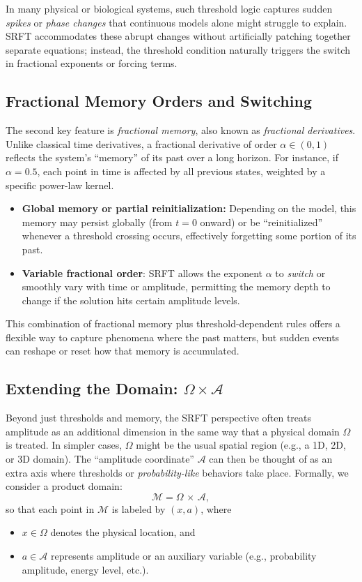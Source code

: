 \documentclass[12pt]{article}
\begin{document}
In many physical or biological systems, such threshold logic captures sudden
\emph{spikes} or \emph{phase changes} that continuous models alone might struggle to
explain. SRFT accommodates these abrupt changes without artificially patching
together separate equations; instead, the threshold condition naturally triggers
the switch in fractional exponents or forcing terms.

\subsection{Fractional Memory Orders and Switching}
The second key feature is \emph{fractional memory}, also known as
\emph{fractional derivatives}. Unlike classical time derivatives, a fractional
derivative of order $\alpha \in (0,1)$ reflects the system’s ``memory'' of its
past over a long horizon. For instance, if $\alpha = 0.5$, each point in time is
affected by all previous states, weighted by a specific power-law kernel.

\begin{itemize}
    \item \textbf{Global memory or partial reinitialization:} Depending on the
          model, this memory may persist globally (from $t = 0$ onward) or be
          ``reinitialized'' whenever a threshold crossing occurs, effectively
          forgetting some portion of its past.  
    \item \textbf{Variable fractional order}: SRFT allows the exponent $\alpha$
          to \emph{switch} or smoothly vary with time or amplitude, permitting
          the memory depth to change if the solution hits certain amplitude
          levels.
\end{itemize}

This combination of fractional memory plus threshold-dependent rules offers a
flexible way to capture phenomena where the past matters, but sudden events can
reshape or reset how that memory is accumulated.

\subsection{Extending the Domain: \texorpdfstring{\(\Omega \times \mathcal{A}\)}{}}
Beyond just thresholds and memory, the SRFT perspective often treats amplitude as
an additional dimension in the same way that a physical domain $\Omega$ is
treated. In simpler cases, $\Omega$ might be the usual spatial region (e.g., a
1D, 2D, or 3D domain). The ``amplitude coordinate'' $\mathcal{A}$ can then be
thought of as an extra axis where thresholds or \emph{probability-like} behaviors
take place. Formally, we consider a product domain:
\[
   \mathcal{M} = \Omega \,\times\, \mathcal{A},
\]
so that each point in $\mathcal{M}$ is labeled by $(x,a)$, where
\begin{itemize}
    \item $x \in \Omega$ denotes the physical location, and
    \item $a \in \mathcal{A}$ represents amplitude or an auxiliary variable
          (e.g., probability amplitude, energy level, etc.).
\end{itemize}
\end{document}

